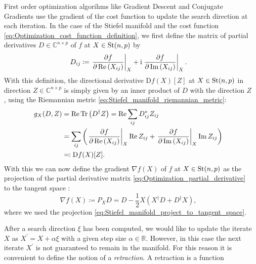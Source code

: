 First order optimization algorihms like Gradient Descent and Conjugate Gradients use the gradient of the cost function to update the search direction at each iteration. In the case of the Stiefel manifold and the cost function \eqref{eq:Optimization_cost_function_definition}, we first define the matrix of partial derivatives $D \in \mathbb{C}^{n\times p}$ of $f$ at $X\in\text{St}(n,p)$ by
\begin{equation}
	\label{eq:Optimization_partial_derivative}
	D_{ij} \coloneqq \left.\frac{\partial f}{\partial \operatorname{Re}\left(X_{ij}\right)}\right|_{X} + \mathrm{i} \left.\frac{\partial f}{\partial \operatorname{Im}\left(X_{ij}\right)}\right|_{X}.
\end{equation}
With this definition, the directional derivative $\text{D}f(X)[Z]$ at $X\in\text{St}(n,p)$ in direction $Z\in\mathbb{C}^{n\times p}$ is simply given by an inner product of $D$ with the direction $Z$, using the Riemannian metric \eqref{eq:Stiefel_manifold_riemannian_metric}:
\begin{equation}
	\label{eq:riemannian_optimization_directional_derivative_partial_derivatives}
	\begin{split}
		g_X(D, Z) &= \operatorname{Re}\operatorname{Tr}\left(D^\dagger Z\right) = \operatorname{Re}\sum_{ij} D_{ij}^*Z_{ij} \\
		&= \sum_{ij} \left(\left.\frac{\partial f}{\partial \operatorname{Re}\left(X_{ij}\right)}\right|_{X}\operatorname{Re} Z_{ij} + \left.\frac{\partial f}{\partial \operatorname{Im}\left(X_{ij}\right)}\right|_{X} \operatorname{Im} Z_{ij}\right) \\
		&\eqqcolon \text{D}f(X)[Z].
	\end{split}
\end{equation}
With this we can now define the gradient $\nabla f(X)$ of $f$ at $X\in\text{St}(n,p)$ as the projection of the partial derivative matrix \eqref{eq:Optimization_partial_derivative} to the tangent space \cite{cite:optimization_on_matrix_manifolds, cite:riemannian_optimization_isometric_tensor_networks}:
\begin{equation}
	\label{eq:riemannian_optimization_gradient_of_cost_function}
	\nabla f(X) \coloneqq P_X D = D - \frac{1}{2}X\left(X^\dagger D + D^\dagger X\right),
\end{equation}
where we used the projection \eqref{eq:Stiefel_manifold_project_to_tangent_space}. \par
After a search direction $\xi$ has been computed, we would like to update the iterate $X$ as $X^\prime = X + \alpha\xi$ with a given step size $\alpha\in\mathbb{R}$. However, in this case the next iterate $X^\prime$ is not guaranteed to remain in the manifold. For this reason it is convenient to define the notion of a \textit{retraction}. A retraction is a function
